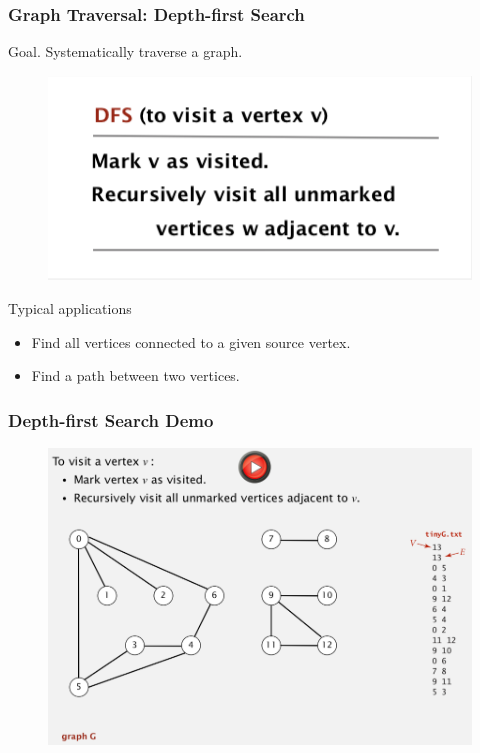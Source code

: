 \documentclass[11pt]{beamer}
\begin{document}
\begin{frame}
	\frametitle	{Graph Traversal: Depth-first Search} 
	\alert{Goal}. Systematically traverse a graph.  
	\begin{figure}
		\centering
		\includegraphics[width=0.8\linewidth]{"Screenshot 2020-12-01 at 6.16.27 AM"}
		\label{fig:screenshot-2020-12-01-at-6}
	\end{figure}
	\alert{Typical applications}
	\begin{itemize}
		\item Find all vertices connected to a given source vertex. 
		\item Find a path between two vertices.
	\end{itemize}	
\end{frame}

\begin{frame}
	\frametitle	{Depth-first Search Demo} 
	\begin{figure}
		\centering
		\includegraphics[width=1\linewidth]{"Screenshot 2020-12-01 at 6.20.04 AM"}
		\label{fig:screenshot-2020-12-01-at-6}
	\end{figure}	
\end{frame}
\end{document}
